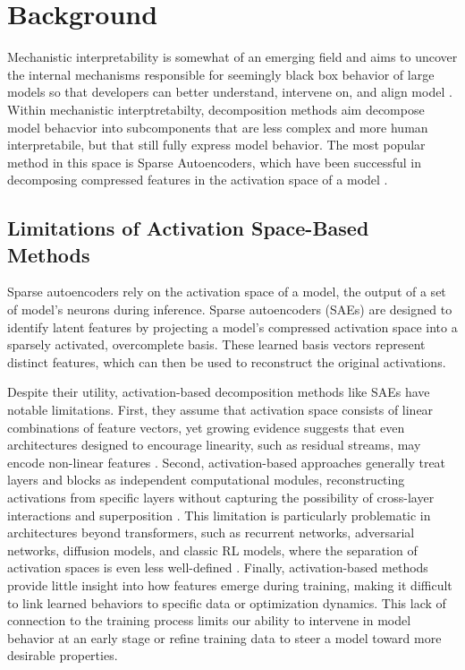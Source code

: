 \documentclass{article}
\theoremstyle{plain}
\theoremstyle{definition}
\theoremstyle{remark}
\begin{document}
\section{Background}


Mechanistic interpretability is somewhat of an emerging field and aims to uncover the internal mechanisms responsible for seemingly black box behavior of large models so that developers can better understand, intervene on, and align model \cite{bereska2024mechanistic}. Within mechanistic interptretabilty, decomposition methods aim decompose model behacvior into subcomponents that are less complex and more human interpretabile, but that still fully express model behavior. The most popular method in this space is Sparse Autoencoders, which have been successful in decomposing compressed features in the activation space of a model \cite{gao2024scaling,cunningham2023sparse,bricken2023towards}.

\subsection{Limitations of Activation Space-Based Methods}

Sparse autoencoders rely on the activation space of a model, the output of a set of model's neurons during inference. Sparse autoencoders (SAEs) are designed to identify latent features by projecting a model's compressed activation space into a sparsely activated, overcomplete basis. These learned basis vectors represent distinct features, which can then be used to reconstruct the original activations.

Despite their utility, activation-based decomposition methods like SAEs have notable limitations. First, they assume that activation space consists of linear combinations of feature vectors, yet growing evidence suggests that even architectures designed to encourage linearity, such as residual streams, may encode non-linear features \cite{engels2024not,engels2024decomposing}. Second, activation-based approaches generally treat layers and blocks as independent computational modules, reconstructing activations from specific layers without capturing the possibility of cross-layer interactions and superposition \cite{merullo2024talking,lindsey2024sparse}. This limitation is particularly problematic in architectures beyond transformers, such as recurrent networks, adversarial networks, diffusion models, and classic RL models, where the separation of activation spaces is even less well-defined \cite{pascanu2013difficulty,goodfellow2014generative,ho2020denoising,mnih2015human}. Finally, activation-based methods provide little insight into how features emerge during training, making it difficult to link learned behaviors to specific data or optimization dynamics. This lack of connection to the training process limits our ability to intervene in model behavior at an early stage or refine training data to steer a model toward more desirable properties.
\end{document}
